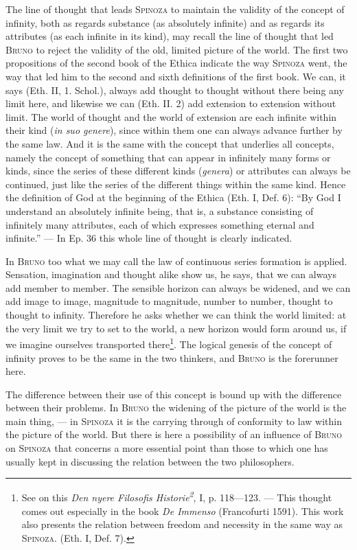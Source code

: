 \documentclass[12pt]{article}
\newcommand{\opage}[1]{\marginnote{\footnotesize\textit{[#1]}}}
\begin{document}
The line of thought that leads \textsc{Spinoza} to maintain the validity of the
concept of infinity, both as regards substance (as absolutely infinite) and as
regards its attributes (as each infinite in its kind), may recall the line of
thought that led \textsc{Bruno} to reject the validity of the old, limited picture
of the world. The first two propositions of the second book of the Ethica indicate
the way \textsc{Spinoza} went, the way that led him to the second and sixth
definitions of the first book. We can, it says (Eth. II, 1. Schol.), always add
thought to thought without there being any limit here, and likewise we can (Eth.
II. 2) add extension to extension without limit. The world of thought and the world
of extension are each infinite within their kind (\textit{in suo genere}), since
within them one can always advance further by the same law. And it is the same
with the concept that underlies all concepts, namely the concept of something that
can appear in infinitely many forms or kinds, since the series of these different
kinds (\textit{genera}) or attributes can always be continued, just like the
series of the different things within the same kind. Hence the definition of God
at the beginning of the Ethica (Eth. I, Def. 6): ``By God I understand an
absolutely infinite being, that is, a substance consisting of infinitely many
attributes, each of which expresses something eternal and infinite.'' --- In Ep.
36 this whole line of thought is clearly indicated.

In \textsc{Bruno} too what we may call the law of continuous series formation is
applied. %
Sensation, imagination and thought alike show us, he says, that we can always add
member to member. The sensible horizon can always be widened, and we can add image
to image, magnitude to magnitude, number to number, thought to thought to infinity.
Therefore he asks whether we can think the world limited: at the very limit we try
to set to the world, a new horizon would form around us, if we imagine ourselves
transported there\footnote{See on this \textit{Den nyere Filosofis
Historie\textsuperscript{2}}, I, p. 118---123. --- This thought comes out
especially in the book \textit{De Immenso} (Francofurti 1591). This work also
presents the relation between freedom and necessity in the same way as
\textsc{Spinoza}. (Eth. I, Def. 7).}. The logical genesis of the concept of
infinity proves to be the same in the two thinkers, and \textsc{Bruno} is the
forerunner here.

The difference \opage{9}between their use of this concept is bound up with the
difference between their problems. In \textsc{Bruno} the widening of the picture
of the world is the main thing, --- in \textsc{Spinoza} it is the carrying through
of conformity to law within the picture of the world. But there is here a
possibility of an influence of \textsc{Bruno} on \textsc{Spinoza} that concerns a
more essential point than those to which one has usually kept in discussing the
relation between the two philosophers.
\end{document}
